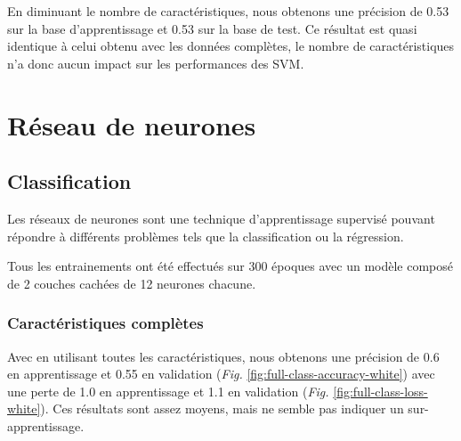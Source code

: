 En diminuant le nombre de caractéristiques, nous obtenons une précision de 0.53 sur la base d'apprentissage et 0.53 sur la base de test. Ce résultat
est quasi identique à celui obtenu avec les données complètes, le nombre de caractéristiques n'a donc aucun impact sur les performances des SVM.

\section{Réseau de neurones}
\label{sec:neurones}

\subsection*{Classification}
\label{sec:classification}

Les réseaux de neurones sont une technique d'apprentissage supervisé pouvant répondre à différents problèmes tels que
la classification ou la régression.

Tous les entrainements ont été effectués sur 300 époques avec un modèle composé de 2 couches cachées de 12 neurones chacune.

\subsubsection*{Caractéristiques complètes}
\label{par:dataset-complet-neurones}

Avec en utilisant toutes les caractéristiques, nous obtenons une précision de 0.6 en apprentissage et 0.55 en validation (\textit{Fig.}
\ref{fig:full-class-accuracy-white}) avec une perte de 1.0 en apprentissage et 1.1 en validation (\textit{Fig.} \ref{fig:full-class-loss-white}).
Ces résultats sont assez moyens, mais ne semble pas indiquer un sur-apprentissage.

